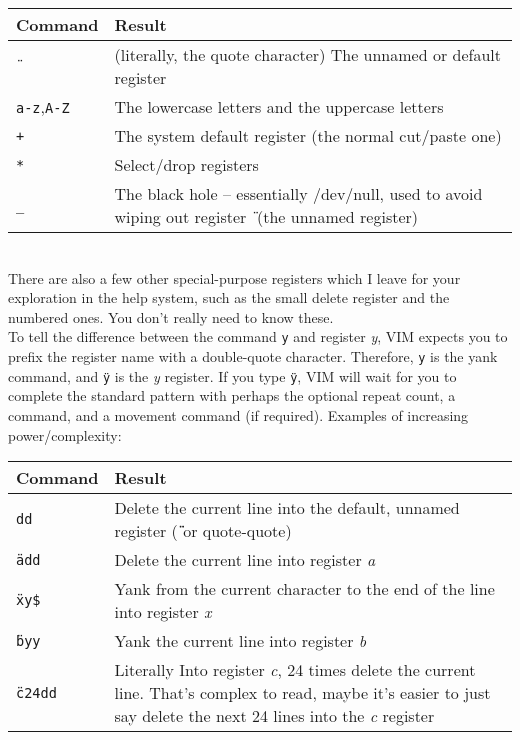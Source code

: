 \documentclass[a4paper, 12pt]{article}
\begin{document}
\begin{tabular}{ l | p{8cm} }
  \textbf{Command} & \textbf{Result}\\ \hline
  \texttt{\"{}} & (literally, the quote character)	The unnamed or default register\\
  \texttt{a-z},\texttt{A-Z} & The lowercase letters and the uppercase letters\\
  \texttt{+} & The system default register (the normal cut/paste one)\\
  \texttt{*} & Select/drop registers\\
  \texttt{\_} & The black hole -- essentially /dev/null, used to avoid wiping out register \texttt{\"{}} (the unnamed register)\\ \hline
\end{tabular}\\ 

There are also a few other special-purpose registers which I leave for your exploration in the help system, such as the small delete register and the numbered ones. You don't really need to know these.\\
To tell the difference between the command \texttt{y} and register \textit{y}, VIM expects you to prefix the register name with a double-quote character. Therefore, \texttt{y} is the yank command, and \texttt{\"{}y} is the \textit{y} register. If you type \texttt{\"{}y}, VIM will wait for you to complete the standard pattern with perhaps the optional repeat count, a command, and a movement command (if required). Examples of increasing power/complexity:

\begin{tabular}{ l | p{8cm} }
  \textbf{Command} & \textbf{Result}\\ \hline
  \texttt{dd} & Delete the current line into the default, unnamed register (\texttt{\"{}\"{}} or quote-quote)\\
  \texttt{\"{}add} & Delete the current line into register \textit{a}\\
  \texttt{\"{}xy\$} & Yank from the current character to the end of the line into register \textit{x}\\
  \texttt{\"{}byy} & Yank the current line into register \textit{b}\\
  \texttt{\"{}c24dd} & Literally Into register \textit{c}, 24 times delete the current line. That's complex to read, maybe it's easier to just say delete the next 24 lines into the \textit{c} register\\ \hline
\end{tabular}\\
\end{document}
